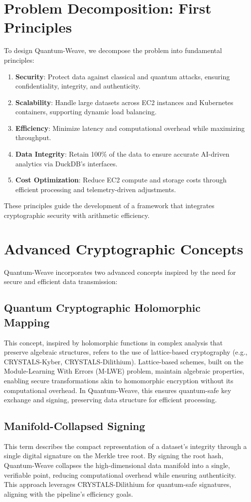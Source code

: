 \documentclass[12pt]{article}
\begin{document}
\section{Problem Decomposition: First Principles}
To design Quantum-Weave, we decompose the problem into fundamental principles:
\begin{enumerate}
    \item \textbf{Security}: Protect data against classical and quantum attacks, ensuring confidentiality, integrity, and authenticity.
    \item \textbf{Scalability}: Handle large datasets across EC2 instances and Kubernetes containers, supporting dynamic load balancing.
    \item \textbf{Efficiency}: Minimize latency and computational overhead while maximizing throughput.
    \item \textbf{Data Integrity}: Retain 100\% of the data to ensure accurate AI-driven analytics via DuckDB’s interfaces.
    \item \textbf{Cost Optimization}: Reduce EC2 compute and storage costs through efficient processing and telemetry-driven adjustments.
\end{enumerate}
These principles guide the development of a framework that integrates cryptographic security with arithmetic efficiency.

\section{Advanced Cryptographic Concepts}
Quantum-Weave incorporates two advanced concepts inspired by the need for secure and efficient data transmission:

\subsection{Quantum Cryptographic Holomorphic Mapping}
This concept, inspired by holomorphic functions in complex analysis that preserve algebraic structures, refers to the use of lattice-based cryptography (e.g., CRYSTALS-Kyber, CRYSTALS-Dilithium). Lattice-based schemes, built on the Module-Learning With Errors (M-LWE) problem, maintain algebraic properties, enabling secure transformations akin to homomorphic encryption without its computational overhead. In Quantum-Weave, this ensures quantum-safe key exchange and signing, preserving data structure for efficient processing.

\subsection{Manifold-Collapsed Signing}
This term describes the compact representation of a dataset’s integrity through a single digital signature on the Merkle tree root. By signing the root hash, Quantum-Weave collapses the high-dimensional data manifold into a single, verifiable point, reducing computational overhead while ensuring authenticity. This approach leverages CRYSTALS-Dilithium for quantum-safe signatures, aligning with the pipeline’s efficiency goals.
\end{document}
